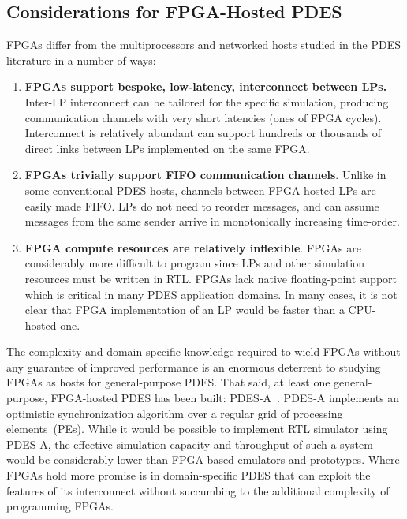 

\subsection{Considerations for FPGA-Hosted PDES}

FPGAs differ from the multiprocessors and networked hosts studied in the PDES literature in a number of ways:

\begin{enumerate}
\item \textbf{FPGAs support bespoke, low-latency, interconnect between LPs.} Inter-LP
interconnect can be tailored for the specific simulation, producing
communication channels with very short latencies (ones of FPGA cycles).
Interconnect is relatively abundant can support hundreds or thousands
of direct links between LPs implemented on the same FPGA.

\item \textbf{FPGAs trivially support FIFO communication channels}. Unlike in
some conventional PDES hosts, channels between FPGA-hosted LPs are easily made FIFO.
LPs do not need to reorder messages, and
can assume messages from the same sender arrive in monotonically increasing
time-order.


\item \textbf{FPGA compute resources are relatively inflexible}. FPGAs are considerably more difficult to
program since LPs and other simulation resources must be written in RTL. FPGAs lack native floating-point support which is
critical in many PDES application domains. In many cases, it is not clear that
FPGA implementation of an LP would be faster than a CPU-hosted one.
\end{enumerate}

The complexity and domain-specific knowledge required to wield FPGAs without
any guarantee of improved performance is an enormous deterrent to studying FPGAs
as hosts for general-purpose PDES. That said, at least one general-purpose, FPGA-hosted
PDES has been built: PDES-A~\cite{PDESA}. PDES-A implements an optimistic
synchronization algorithm over a regular grid of processing elements~(PEs).  While it would be
possible to implement RTL simulator using PDES-A, the effective simulation
capacity and throughput of such a system would be considerably lower than
FPGA-based emulators and prototypes. Where FPGAs hold more promise is in domain-specific PDES that
can exploit the features of its interconnect without succumbing to the additional complexity of programming FPGAs.

